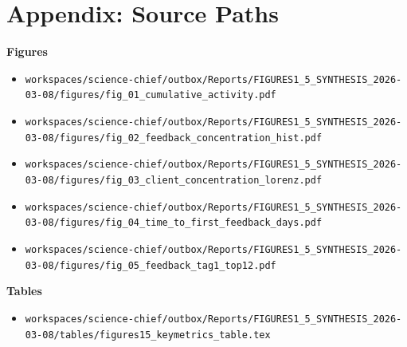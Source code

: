 \documentclass[11pt,a4paper]{article}
\begin{document}
\section*{Appendix: Source Paths}
\textbf{Figures}\\
\begin{itemize}
\item \texttt{workspaces/science-chief/outbox/Reports/FIGURES1\_5\_SYNTHESIS\_2026-03-08/figures/fig\_01\_cumulative\_activity.pdf}
\item \texttt{workspaces/science-chief/outbox/Reports/FIGURES1\_5\_SYNTHESIS\_2026-03-08/figures/fig\_02\_feedback\_concentration\_hist.pdf}
\item \texttt{workspaces/science-chief/outbox/Reports/FIGURES1\_5\_SYNTHESIS\_2026-03-08/figures/fig\_03\_client\_concentration\_lorenz.pdf}
\item \texttt{workspaces/science-chief/outbox/Reports/FIGURES1\_5\_SYNTHESIS\_2026-03-08/figures/fig\_04\_time\_to\_first\_feedback\_days.pdf}
\item \texttt{workspaces/science-chief/outbox/Reports/FIGURES1\_5\_SYNTHESIS\_2026-03-08/figures/fig\_05\_feedback\_tag1\_top12.pdf}
\end{itemize}
\textbf{Tables}\\
\begin{itemize}
\item \texttt{workspaces/science-chief/outbox/Reports/FIGURES1\_5\_SYNTHESIS\_2026-03-08/tables/figures15\_keymetrics\_table.tex}
\end{itemize}
\end{document}
